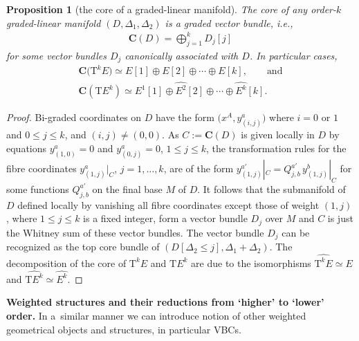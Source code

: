 \documentclass[pdftex]{sigma}
\newcommand{\ZM}{{VBC}} %
\newcommand{\degree}{{order}}
\newcommand{\T}{\mathrm{T}} %
\newcommand{\TT}[1]{\mathrm{T}^{#1}} %
\newcommand{\core}[1]{\widehat{#1}} %
\newcommand{\Core}{\mathbf{C}}
\numberwithin{equation}{section}
\newtheorem{prop}[thm]{Proposition}
\theoremstyle{definition}
\begin{document}
\begin{prop}[the core of a graded-linear manifold]\label{p:core_gr_lin_bndl} The core of any \degree-$k$ graded-linear manifold $(D, \Delta_1, \Delta_2)$ is a graded vector bundle, i.e.,
\begin{gather*}
\Core(D) = \bigoplus_{j=1}^k D_j[j]
\end{gather*}
for some vector bundles $D_j$ canonically associated with $D$. In particular cases,
\begin{gather*}
\Core\big(\TT{k} E\big) \simeq E[1]\oplus E[2] \oplus \cdots \oplus E[k], \qquad \text{and}\\
\Core(\T E^k) \simeq E^1[1] \oplus \core{E^2}[2] \oplus \cdots \oplus \core{E^k}[k].
\end{gather*}
\end{prop}
\begin{proof}Bi-graded coordinates on $D$ have the form $\big(x^A, y^a_{(i, j)}\big)$ where $i=0$ or $1$ and $0\leq j\leq k$, and $(i,j)\neq (0,0)$. As $C:= \Core(D)$ is given locally in $D$ by equations $y^a_{(1, 0)}=0$ and $y^a_{(0, j)}=0$, $1\leq j\leq k$, the transformation rules for the fibre coordinates $y^a_{(1, j)}|_{C}$, $j=1, \ldots, k$, are of the form $y^{a'}_{(1, j)}|_{C} = Q^{a'}_{j, b}\, y^b_{(1, j)}|_{C}$ for some functions $Q^{a'}_{j, b}$ on the final base $M$ of $D$. It follows that the submanifold of $D$ defined locally by vanishing all fibre coordinates except those of weight ${(1, j)}$, where $1\leq j\leq k$ is a fixed integer, form a vector bundle $D_j$ over $M$ and $C$ is just the Whitney sum of these vector bundles.
 The vector bundle $D_j$ can be recognized as the top core bundle of $(D[\Delta_2\leq j], \Delta_1+\Delta_2)$. The decomposition of the core of $\T^k E$ and $\T E^k$ are due to the isomorphisms $\core{\T^k E}\simeq E$ and $\core{\T E^k} \simeq \core{E^k}$. \end{proof}

{\bf Weighted structures and their reductions from `higher' to `lower' order.} In a~similar manner we can introduce notion of other weighted geometrical objects and structures, in particular \ZM s.
\end{document}
